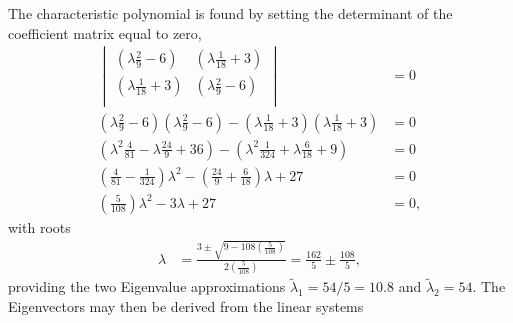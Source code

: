 The characteristic polynomial is found by setting the determinant of the coefficient matrix equal to zero,
\begin{align*}
  \begin{vmatrix}
    \left( \lambda \frac{2}{9} - 6 \right) & \left( \lambda \frac{1}{18} + 3 \right) \\
    \left( \lambda \frac{1}{18} + 3 \right) & \left( \lambda \frac{2}{9} - 6 \right) \\
  \end{vmatrix} &= 0 \\
  \left( \lambda \frac{2}{9} - 6 \right) \left( \lambda \frac{2}{9} - 6 \right) - \left( \lambda \frac{1}{18} + 3 \right) \left( \lambda \frac{1}{18} + 3 \right) &= 0 \\
  \left( \lambda^2 \frac{4}{81} - \lambda \frac{24}{9} + 36 \right) - \left( \lambda^2 \frac{1}{324} + \lambda \frac{6}{18} + 9 \right) &= 0 \\
  \left( \frac{4}{81} - \frac{1}{324} \right) \lambda^2 - \left( \frac{24}{9} + \frac{6}{18} \right) \lambda + 27 &= 0 \\
  \left( \frac{5}{108} \right) \lambda^2 - 3 \lambda + 27 &= 0,
\end{align*}
with roots
\begin{align*}
  \lambda &= \frac{3 \pm \sqrt{9 - 108\left( \frac{5}{108} \right)}}{2\left( \frac{5}{108} \right)} = \frac{162}{5} \pm \frac{108}{5},
\end{align*}
providing the two Eigenvalue approximations $\widetilde{\lambda}_1 = 54/5 = 10.8$ and $\widetilde{\lambda}_2 = 54$.  The Eigenvectors may then be derived from the linear systems
